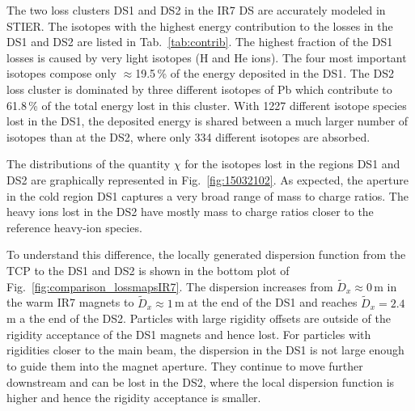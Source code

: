 \vspace{0.2cm}

The two loss clusters DS1 and DS2 in the IR7 DS are accurately modeled in STIER. The isotopes with the highest energy contribution to the losses in the DS1 and DS2 are listed in Tab.~\ref{tab:contrib}. The highest fraction of the DS1 losses is caused by very light isotopes (H and He ions). The four most important isotopes compose only $\approx$19.5\,\% of the energy deposited in the DS1. The DS2 loss cluster is dominated by three different isotopes of Pb which contribute to 61.8\,\% of the total energy lost in this cluster.  With 1227 different isotope species lost in the DS1, the deposited energy is shared between a much larger number of isotopes than at the DS2, where only 334 different isotopes are absorbed. 

\vspace{0.2cm}
The distributions of the quantity $\chi$ for the isotopes lost in the regions DS1 and DS2 are graphically represented in Fig.~\ref{fig:15032102}. As expected, the aperture in the cold region DS1 captures a very broad range of mass to charge ratios. The heavy ions lost in the DS2 have mostly mass to charge ratios closer to the reference heavy-ion species. 

To understand this difference, the locally generated dispersion function from the TCP to the DS1 and DS2 is shown in the bottom plot of Fig.~\ref{fig:comparison_lossmapsIR7}. The dispersion increases from $\tilde{D}_x\approx0\,$m in the warm IR7 magnets to $\tilde{D}_x \approx 1\,$m at the end of the DS1 and reaches $\tilde{D}_x=2.4\,$m a the end of the DS2. Particles with large rigidity offsets are outside of the rigidity acceptance of the DS1 magnets and hence lost. For particles with rigidities closer to the main beam, the dispersion in the DS1 is not large enough to guide them into the magnet aperture. They continue to move further downstream and can be lost in the DS2, where the local dispersion function is higher and hence the rigidity acceptance is smaller. 










